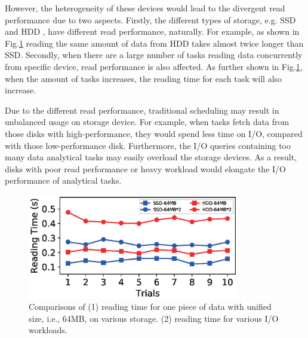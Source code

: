 \documentclass[conference]{IEEEtran}
\begin{document}
However, the heterogeneity of these devices would lead to the divergent read performance due to two aspects. Firstly, the different types of storage, e.g. SSD \cite{b32} and HDD \cite{b33}, have different read performance, naturally. For example, as shown in Fig.\ref{Fig:motivation} reading the same amount of data from HDD takes almost twice longer than SSD. Secondly, when there are a large number of tasks reading data concurrently from specific device, read performance is also affected. As further shown in Fig.\ref{Fig:motivation}, when the amount of tasks increases, the reading time for each task will also increase.

Due to the different read performance, traditional scheduling may result in unbalanced usage on storage device. For example, when tasks fetch data from those disks with high-performance, they would spend less time on I/O, compared with those low-performance disk. Furthermore, the I/O queries containing too many data analytical tasks may easily overload the storage devices. As a result, disks with poor read performance or heavy workload would elongate the I/O performance of analytical tasks.

\begin{figure}[!t]
	\centering
	\includegraphics[height=1.8in]{fig_motivation5.eps}
	\caption{Comparisons of (1) reading time for one piece of data with unified size, i.e., 64MB, on various storage. (2) reading time for various I/O workloads.}
	\label{Fig:motivation}
\end{figure} 

 
\end{document}
